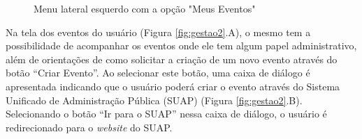 \begin{figure}[H]
    \centering
    \caption{Menu lateral esquerdo com a opção "Meus Eventos"}
    \label{fig:gestao1}
\end{figure}

Na tela dos eventos do usuário (Figura \ref{fig:gestao2}.A), o mesmo tem a possibilidade de acompanhar os eventos onde ele tem algum papel administrativo, além de orientações de como solicitar a criação de um novo evento através do botão “Criar Evento”. Ao selecionar este botão, uma caixa de diálogo é apresentada indicando que o usuário poderá criar o evento através do Sistema Unificado de Administração Pública (SUAP) (Figura \ref{fig:gestao2}.B). Selecionando o botão “Ir para o SUAP” nessa caixa de diálogo, o usuário é redirecionado para o \textit{website} do SUAP.


